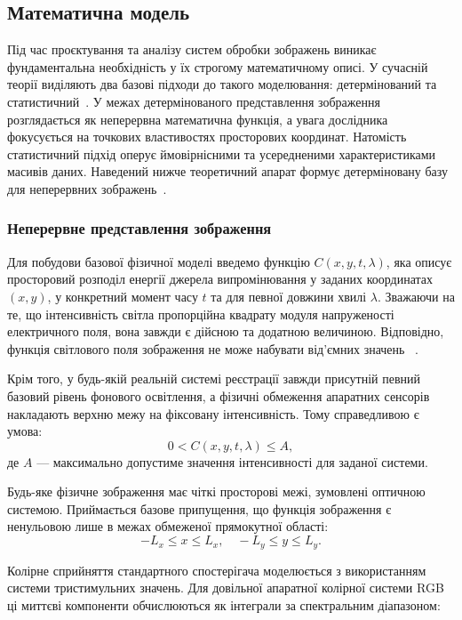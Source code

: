 \subsection{Математична модель}

Під час проєктування та аналізу систем обробки зображень виникає фундаментальна необхідність у їх строгому математичному описі. У сучасній теорії виділяють два базові підходи до такого моделювання: детермінований та статистичний~\cite{aslam_optimized}. У межах детермінованого представлення зображення розглядається як неперервна математична функція, а увага дослідника фокусується на точкових властивостях просторових координат. Натомість статистичний підхід оперує ймовірнісними та усередненими характеристиками масивів даних. Наведений нижче теоретичний апарат формує детерміновану базу для неперервних зображень~\cite{aslam_optimized}.

\subsubsection{Неперервне представлення зображення}

Для побудови базової фізичної моделі введемо функцію $C(x, y, t, \lambda)$, яка описує просторовий розподіл енергії джерела випромінювання у заданих координатах $(x, y)$, у конкретний момент часу $t$ та для певної довжини хвилі $\lambda$. Зважаючи на те, що інтенсивність світла пропорційна квадрату модуля напруженості електричного поля, вона завжди є дійсною та додатною величиною. Відповідно, функція світлового поля зображення не може набувати від'ємних значень ~\cite{pratt2014introduction}. 

Крім того, у будь-якій реальній системі реєстрації завжди присутній певний базовий рівень фонового освітлення, а фізичні обмеження апаратних сенсорів накладають верхню межу на фіксовану інтенсивність. Тому справедливою є умова:
\begin{equation}
	0 < C(x, y, t, \lambda) \le A,
\end{equation}
де $A$ --- максимально допустиме значення інтенсивності для заданої системи.

Будь-яке фізичне зображення має чіткі просторові межі, зумовлені оптичною системою. Приймається базове припущення, що функція зображення є ненульовою лише в межах обмеженої прямокутної області:
\begin{equation}
	-L_x \le x \le L_x, \quad -L_y \le y \le L_y.
\end{equation}

Колірне сприйняття стандартного спостерігача моделюється з використанням системи тристимульних значень. Для довільної апаратної колірної системи RGB ці миттєві компоненти обчислюються як інтеграли за спектральним діапазоном:

